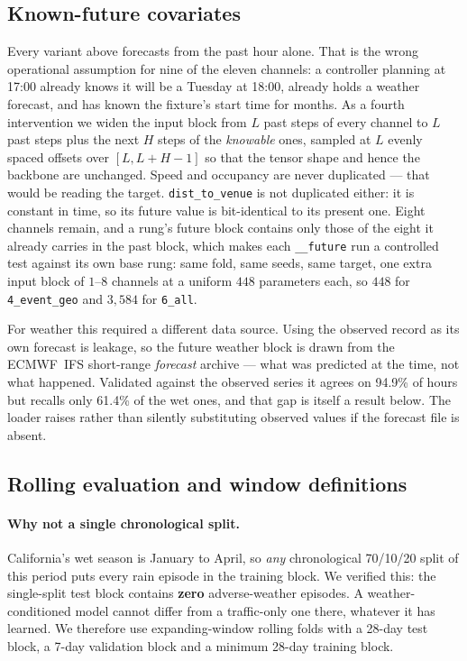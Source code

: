 \documentclass[letterpaper]{article}
\begin{document}
\subsection{Known-future covariates}
\label{sec:future}

Every variant above forecasts from the past hour alone. That is the wrong operational assumption for nine of the eleven channels: a controller planning at 17:00 already knows it will be a Tuesday at 18:00, already holds a weather forecast, and has known the fixture's start time for months. As a fourth intervention we widen the input block from $L$ past steps of every channel to $L$ past steps plus the next $H$ steps of the \emph{knowable} ones, sampled at $L$ evenly spaced offsets over $[L,L+H-1]$ so that the tensor shape and hence the backbone are unchanged. Speed and occupancy are never duplicated --- that would be reading the target. \texttt{dist\_to\_venue} is not duplicated either: it is constant in time, so its future value is bit-identical to its present one. Eight channels remain, and a rung's future block contains only those of the eight it already carries in the past block, which makes each \texttt{\_\_future} run a controlled test against its own base rung: same fold, same seeds, same target, one extra input block of $1$--$8$ channels at a uniform $448$ parameters each, so $448$ for \texttt{4\_event\_geo} and $3{,}584$ for \texttt{6\_all}.

For weather this required a different data source. Using the observed record as its own forecast is leakage, so the future weather block is drawn from the ECMWF~IFS short-range \emph{forecast} archive --- what was predicted at the time, not what happened. Validated against the observed series it agrees on 94.9\% of hours but recalls only 61.4\% of the wet ones, and that gap is itself a result below. The loader raises rather than silently substituting observed values if the forecast file is absent.

\subsection{Rolling evaluation and window definitions}
\label{sec:protocol}

\paragraph{Why not a single chronological split.} California's wet season is January to April, so \emph{any} chronological 70/10/20 split of this period puts every rain episode in the training block. We verified this: the single-split test block contains \textbf{zero} adverse-weather episodes. A weather-conditioned model cannot differ from a traffic-only one there, whatever it has learned. We therefore use expanding-window rolling folds with a 28-day test block, a 7-day validation block and a minimum 28-day training block.
\end{document}
